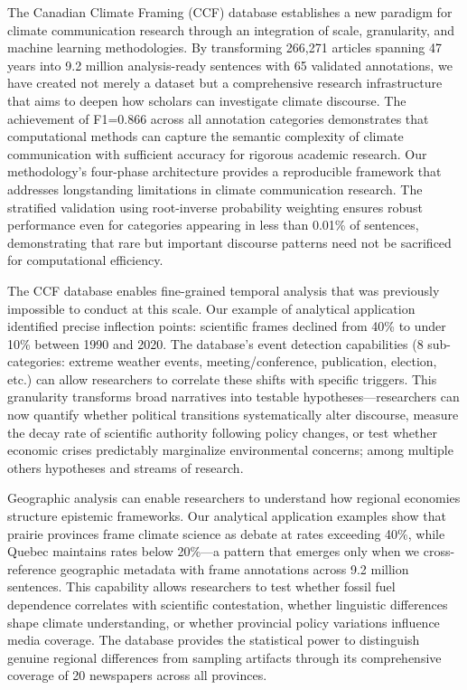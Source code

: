 \documentclass[12pt]{article}
\begin{document}
The Canadian Climate Framing (CCF) database establishes a new paradigm for climate communication research through an integration of scale, granularity, and machine learning methodologies. By transforming 266,271 articles spanning 47 years into 9.2 million analysis-ready sentences with 65 validated annotations, we have created not merely a dataset but a comprehensive research infrastructure that aims to deepen how scholars can investigate climate discourse. The achievement of F1=0.866 across all annotation categories demonstrates that computational methods can capture the semantic complexity of climate communication with sufficient accuracy for rigorous academic research. Our methodology's four-phase architecture provides a reproducible framework that addresses longstanding limitations in climate communication research. The stratified validation using root-inverse probability weighting ensures robust performance even for categories appearing in less than 0.01\% of sentences, demonstrating that rare but important discourse patterns need not be sacrificed for computational efficiency.

The CCF database enables fine-grained temporal analysis that was previously impossible to conduct at this scale. Our example of analytical application identified precise inflection points: scientific frames declined from 40\% to under 10\% between 1990 and 2020. The database's event detection capabilities (8 sub-categories: extreme weather events, meeting/conference, publication, election, etc.) can allow researchers to correlate these shifts with specific triggers. This granularity transforms broad narratives into testable hypotheses—researchers can now quantify whether political transitions systematically alter discourse, measure the decay rate of scientific authority following policy changes, or test whether economic crises predictably marginalize environmental concerns; among multiple others hypotheses and streams of research.

Geographic analysis can enable researchers to understand how regional economies structure epistemic frameworks. Our analytical application examples show that prairie provinces frame climate science as debate at rates exceeding 40\%, while Quebec maintains rates below 20\%—a pattern that emerges only when we cross-reference geographic metadata with frame annotations across 9.2 million sentences. This capability allows researchers to test whether fossil fuel dependence correlates with scientific contestation, whether linguistic differences shape climate understanding, or whether provincial policy variations influence media coverage. The database provides the statistical power to distinguish genuine regional differences from sampling artifacts through its comprehensive coverage of 20 newspapers across all provinces.
\end{document}
